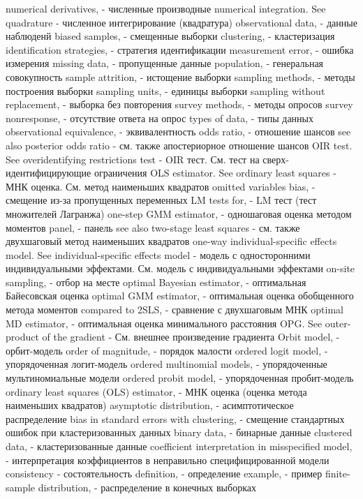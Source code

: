 numerical derivatives,  - численные производные
numerical integration. See quadrature - численное интегрирование (квадратура)
observational data, - данные наблюденй
biased samples, - смещенные выборки
clustering, - кластеризация
identification strategies, - стратегия идентификации
measurement error, - ошибка измерения
missing data, - пропущенные данные
population, - генеральная совокупность
sample attrition, - истощение выборки
sampling methods, - методы построения выборки
sampling units, - единицы выборки
sampling without replacement, - выборка без повторения
survey methods, - методы опросов
survey nonresponse, - отсутствие ответа на опрос
types of data, - типы данных
observational equivalence, - эквивалентность
odds ratio, - отношение шансов
see also posterior odds ratio - см. также апостериорное отношение шансов
OIR test. See overidentifying restrictions test - OIR тест. См. тест на сверх-идентифицирующие ограничения
OLS estimator. See ordinary least squares - МНК оценка. См. метод наименьших квадратов
omitted variables bias, - смещение из-за пропущенных переменных
LM tests for, - LM тест (тест множителей Лагранжа)
one-step GMM estimator, - одношаговая оценка методом моментов
panel, - панель
see also two-stage least squares - см. также двухшаговый метод наименьших квадратов
one-way individual-specific effects model. See individual-specific effects model - модель с односторонними индивидуальными эффектами. См. модель с индивидуальными эффектами
on-site sampling, - отбор на месте
optimal Bayesian estimator, - оптимальная Байесовская оценка
optimal GMM estimator, - оптимальная оценка обобщенного метода моментов
compared to 2SLS, - сравнение с двухшаговым МНК
optimal MD estimator, - оптимальная оценка минимального расстояния
OPG. See outer-product of the gradient - См. внешнее произведение градиента
Orbit model, - орбит-модель
order of magnitude, - порядок малости
ordered logit model, - упорядоченная логит-модель
ordered multinomial models, - упорядоченные мультиномиальные модели
ordered probit model, - упорядоченная пробит-модель
ordinary least squares (OLS) estimator, - МНК оценка (оценка метода наименьших квадратов)
asymptotic distribution, - асимптотическое распределение
bias in standard errors with clustering, - смещение стандартных ошибок при кластеризованных данных
binary data, - бинарные данные
clustered data, - кластеризованные данные
coefficient interpretation in misspecified model, - интерпретация коэффициентов в неправильно специфицированной модели
consistency - состоятельность
definition, - определение
example, - пример
finite-sample distribution, - распределение в конечных выборках
